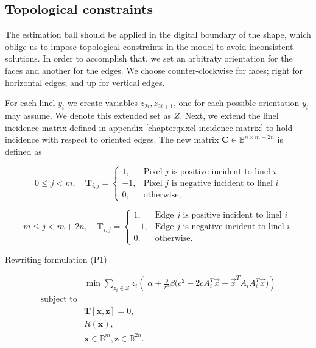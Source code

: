 \subsection{Topological constraints}
\label{ch6:subsec:topological-constraints}

The estimation ball should be applied in the digital boundary of the shape, which oblige us to impose topological constraints in the model to avoid inconsistent solutions. In order to accomplish that, we set an arbitraty orientation for the faces and another for the edges. We choose counter-clockwise for faces; right for horizontal edges; and up for vertical edges.


For each linel $y_i$ we create variables $z_{2i},z_{2i+1}$, one for each possible orientation $y_i$ may assume. We denote this extended set as $Z$. Next, we extend the linel incidence matrix defined in appendix \ref{chapter:pixel-incidence-matrix} to hold incidence with respect to oriented edges. The new matrix $\mathbf{C} \in \mathbb{B}^{n \times m + 2n}$ is defined as

\[
	0 \leq j < m, \quad \mathbf{T}_{i,j} = \left\{ \begin{array}{ll}
	
	1,& \text{Pixel $j$ is positive incident to linel $i$}\\
	-1,& \text{Pixel $j$ is negative incident to linel $i$}\\	
	0,& \text{otherwise},
	\end{array}\right.
\]

\[
	m \leq j < m + 2n, \quad \mathbf{T}_{i,j} = \left\{ \begin{array}{ll}
	
	1,& \text{Edge $j$ is positive incident to linel $i$}\\
	-1,& \text{Edge $j$ is negative incident to linel $i$}\\	
	0,& \text{otherwise}.
	\end{array}\right.
\]

Rewriting formulation (P1)

\[
\begin{array}{ll}
& \displaystyle	\min \sum_{z_i \in Z}{ z_i \left(\; \alpha + \frac{9}{r^6}\beta \big(c^2 - 2cA_i^T\vec{x} + \vec{x}^TA_iA_i^T\vec{x}\big)\right)} \\
\text{subject to}\\
&	\mathbf{T}[ \mathbf{x}, \mathbf{z}] = 0,\\
&   R(\mathbf{x}),\\
&   \mathbf{x} \in \mathbb{B}^{m}, \mathbf{z} \in \mathbb{B}^{2n}.
\end{array}
\]


